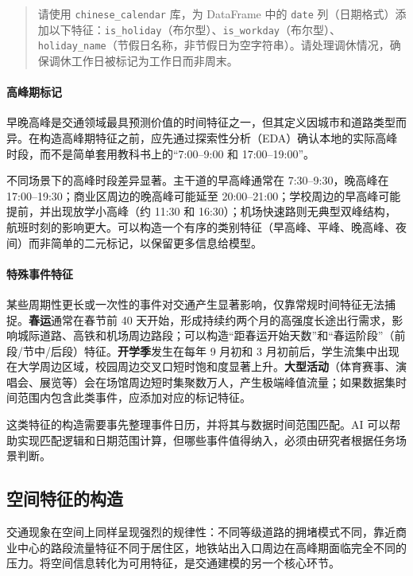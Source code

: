 \begin{quote}
请使用 \texttt{chinese\_calendar} 库，为 DataFrame 中的 \texttt{date} 列（日期格式）添加以下特征：\texttt{is\_holiday}（布尔型）、\texttt{is\_workday}（布尔型）、\texttt{holiday\_name}（节假日名称，非节假日为空字符串）。请处理调休情况，确保调休工作日被标记为工作日而非周末。
\end{quote}

\paragraph{高峰期标记}

早晚高峰是交通领域最具预测价值的时间特征之一，但其定义因城市和道路类型而异。在构造高峰期特征之前，应先通过探索性分析（EDA）确认本地的实际高峰时段，而不是简单套用教科书上的“7:00--9:00 和 17:00--19:00”。

不同场景下的高峰时段差异显著。主干道的早高峰通常在 7:30--9:30，晚高峰在 17:00--19:30；商业区周边的晚高峰可能延至 20:00--21:00；学校周边的早高峰可能提前，并出现放学小高峰（约 11:30 和 16:30）；机场快速路则无典型双峰结构，航班时刻的影响更大。可以构造一个有序的类别特征（早高峰、平峰、晚高峰、夜间）而非简单的二元标记，以保留更多信息给模型。

\paragraph{特殊事件特征}

某些周期性更长或一次性的事件对交通产生显著影响，仅靠常规时间特征无法捕捉。\textbf{春运}通常在春节前 40 天开始，形成持续约两个月的高强度长途出行需求，影响城际道路、高铁和机场周边路段；可以构造“距春运开始天数”和“春运阶段”（前段/节中/后段）特征。\textbf{开学季}发生在每年 9 月初和 3 月初前后，学生流集中出现在大学周边区域，校园周边交叉口短时饱和度显著上升。\textbf{大型活动}（体育赛事、演唱会、展览等）会在场馆周边短时集聚数万人，产生极端峰值流量；如果数据集时间范围内包含此类事件，应添加对应的标记特征。

这类特征的构造需要事先整理事件日历，并将其与数据时间范围匹配。AI 可以帮助实现匹配逻辑和日期范围计算，但哪些事件值得纳入，必须由研究者根据任务场景判断。

\subsection{空间特征的构造}

交通现象在空间上同样呈现强烈的规律性：不同等级道路的拥堵模式不同，靠近商业中心的路段流量特征不同于居住区，地铁站出入口周边在高峰期面临完全不同的压力。将空间信息转化为可用特征，是交通建模的另一个核心环节。

